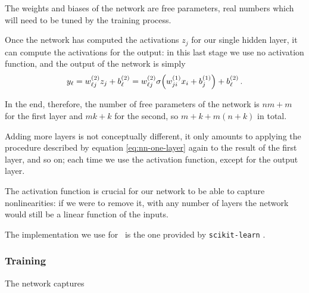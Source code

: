 \documentclass[main.tex]{subfiles}
\begin{document}
The weights and biases of the network are free parameters, real numbers which will need to be tuned by the training process. 

Once the network has computed the activations \(z_j\) for our single hidden layer, it can compute the activations for the output: in this last stage we use no activation function, and the output of the network is simply 
%
\begin{align}
y_\ell = w^{(2)}_{\ell j} z_j + b^{(2)}_{\ell} 
= w^{(2)}_{\ell j} \sigma \qty( w^{(1)}_{ji} x_i + b^{(1)}_j ) + b^{(2)}_{\ell}
\,.
\end{align}

In the end, therefore, the number of free parameters of the network is \(nm + m\) for the first layer and \(mk + k\) for the second, so \(m + k + m (n+k)\) in total.

Adding more layers is not conceptually different, it only amounts to applying the procedure described by equation \ref{eq:nn-one-layer} again to the result of the first layer, and so on; each time we use the activation function, except for the output layer.

The activation function is crucial for our network to be able to capture nonlinearities: if we were to remove it, with any number of layers the network would still be a linear function of the inputs. 

The implementation we use for \mb \ is the one provided by \texttt{scikit-learn} \cite[]{pedregosaScikitlearnMachineLearning2011}. 

\subsubsection{Training}

The network captures 
\end{document}

